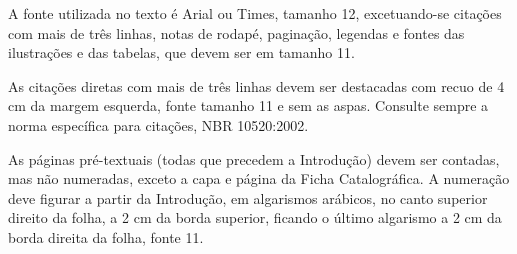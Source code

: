 A fonte utilizada no texto é Arial ou Times, tamanho 12, excetuando-se citações com mais de três linhas, notas de rodapé, paginação, legendas e fontes das ilustrações e das tabelas, que devem ser em tamanho 11. 

As citações diretas com mais de três linhas devem ser destacadas com recuo de 4 cm da margem esquerda, fonte tamanho 11 e sem as aspas. Consulte sempre a norma específica para citações, NBR 10520:2002.

As páginas pré-textuais (todas que precedem a Introdução) devem ser contadas, mas não numeradas, exceto a capa e página da Ficha Catalográfica. A numeração deve figurar a partir da Introdução, em algarismos arábicos, no canto superior direito da folha, a 2 cm da borda superior, ficando o último algarismo a 2 cm da borda direita da folha, fonte 11.